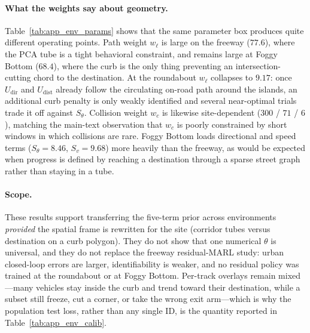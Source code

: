 \documentclass[conference]{IEEEtran}
\begin{document}
\paragraph{What the weights say about geometry.}
Table~\ref{tab:app_env_params} shows that the same parameter box produces quite different operating points. Path weight $w_{\ell}$ is large on the freeway ($77.6$), where the PCA tube is a tight behavioral constraint, and remains large at Foggy Bottom ($68.4$), where the curb is the only thing preventing an intersection-cutting chord to the destination. At the roundabout $w_{\ell}$ collapses to $9.17$: once $U_{\mathrm{dir}}$ and $U_{\mathrm{dist}}$ already follow the circulating on-road path around the islands, an additional curb penalty is only weakly identified and several near-optimal trials trade it off against $S_{\theta}$. Collision weight $w_{c}$ is likewise site-dependent ($300$ / $71$ / $6$), matching the main-text observation that $w_{c}$ is poorly constrained by short windows in which collisions are rare. Foggy Bottom loads directional and speed terms ($S_{\theta}=8.46$, $S_{v}=9.68$) more heavily than the freeway, as would be expected when progress is defined by reaching a destination through a sparse street graph rather than staying in a tube.

\paragraph{Scope.}
These results support transferring the five-term prior across environments \emph{provided} the spatial frame is rewritten for the site (corridor tubes versus destination on a curb polygon). They do not show that one numerical $\theta$ is universal, and they do not replace the freeway residual-MARL study: urban closed-loop errors are larger, identifiability is weaker, and no residual policy was trained at the roundabout or at Foggy Bottom. Per-track overlays remain mixed---many vehicles stay inside the curb and trend toward their destination, while a subset still freeze, cut a corner, or take the wrong exit arm---which is why the population test loss, rather than any single ID, is the quantity reported in Table~\ref{tab:app_env_calib}.
\end{document}
